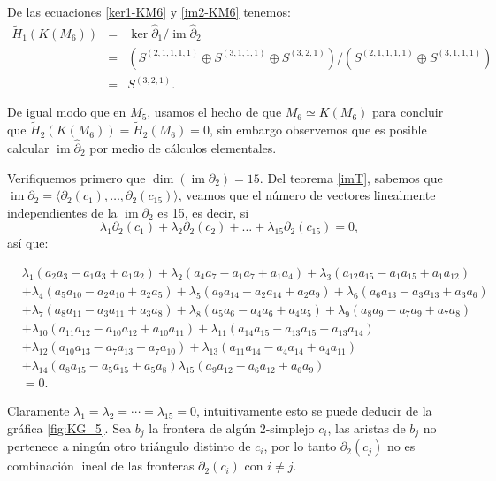 \documentclass[12pt]{book}
\theoremstyle{definition}
\DeclareMathOperator{\im}{im}
\newcounter{in}
\begin{document}
De las ecuaciones \ref{ker1-KM6} y \ref{im2-KM6} tenemos:
\begin{eqnarray*}
  \widetilde H_{1}(K(M_{6}))&=&\ker \widehat\partial_{1}/\im
  \widehat\partial_{2}\\
  &=&(S^{(2,1,1,1,1)}\oplus S^{(3,1,1,1)}\oplus
  S^{(3,2,1)})/(S^{(2,1,1,1,1)}\oplus S^{(3,1,1,1)})\\
  &=&S^{(3,2,1)}.
\end{eqnarray*}

De igual modo que en $M_{5}$, usamos el hecho de que $M_{6}\simeq K(M_{6})$  para
concluir que $\widetilde H_{2}(K(M_{6}))=\widetilde H_{2}(M_{6})=0$, sin embargo observemos que 
es posible calcular $\im \widehat\partial_{2}$ por medio de cálculos elementales.

Verifiquemos primero que $\dim(\im \partial_{2})=15$. Del teorema
\ref{imT}, sabemos que
$\im \partial_{2}=\langle\partial_{2}(c_{1}),\ldots,\partial_{2}(c_{15})\rangle$,
veamos que el número de vectores linealmente independientes de la
$\im \partial_{2}$ es 15, es
decir, si
$$\lambda_{1}\partial_{2}(c_{1})+\lambda_{2}\partial_{2}(c_{2})+\ldots+\lambda_{15}\partial_{2}(c_{15})=0,$$
así que:

\begin{footnotesize}
  \begin{align*}
    &\lambda_{1}(a_{2}a_{3}-a_{1}a_{3}+a_{1}a_{2})+\lambda_{2}(a_{4}a_{7}-a_{1}a_{7}+a_{1}a_{4})+\lambda_{3}(a_{12}a_{15}-a_{1}a_{15}+a_{1}a_{12})\\
    &+\lambda_{4}(a_{5}a_{10}-a_{2}a_{10}+a_{2}a_{5})+\lambda_{5}(a_{9}a_{14}-a_{2}a_{14}+a_{2}a_{9})+\lambda_{6}(a_{6}a_{13}-a_{3}a_{13}+a_{3}a_{6})\\
    &+\lambda_{7}(a_{8}a_{11}-a_{3}a_{11}+a_{3}a_{8})+\lambda_{8}(a_{5}a_{6}-a_{4}a_{6}+a_{4}a_{5})+\lambda_{9}(a_{8}a_{9}-a_{7}a_{9}+a_{7}a_{8})\\
    &+\lambda_{10}(a_{11}a_{12}-a_{10}a_{12}+a_{10}a_{11})+\lambda_{11}(a_{14}a_{15}-a_{13}a_{15}+a_{13}a_{14})\\
    &+\lambda_{12}(a_{10}a_{13}-a_{7}a_{13}+a_{7}a_{10})+\lambda_{13}(a_{11}a_{14}-a_{4}a_{14}+a_{4}a_{11})\\
    &+\lambda_{14}(a_{8}a_{15}-a_{5}a_{15}+a_{5}a_{8})\lambda_{15}(a_{9}a_{12}-a_{6}a_{12}+a_{6}a_{9})\\
    &=0.
  \end{align*}
\end{footnotesize}
Claramente $\lambda_{1}=\lambda_{2}=\cdots=\lambda_{15}=0$,
intuitivamente esto se puede deducir de la gráfica \ref{fig:KG_5}.
Sea $b_{j}$ la frontera de algún $2$-simplejo $c_{i}$, las aristas
de $b_{j}$ no pertenece a ningún otro triángulo distinto de $c_{i}$, por
lo tanto $\partial_{2}(c_{j})$ no es combinación lineal de las fronteras
$\partial_{2}(c_{i})$ con $i\neq j$.
\end{document}
